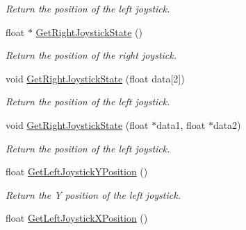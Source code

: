 \begin{DoxyCompactItemize}
\begin{DoxyCompactList}\small\item\em Return the position of the left joystick. \item\end{DoxyCompactList}\item 
\hypertarget{classvtkVSP_a4ec2368aca2a41fa84ac3216c7bc95cd}{
float $\ast$ \hyperlink{classvtkVSP_a4ec2368aca2a41fa84ac3216c7bc95cd}{GetRightJoystickState} ()}
\label{classvtkVSP_a4ec2368aca2a41fa84ac3216c7bc95cd}

\begin{DoxyCompactList}\small\item\em Return the position of the right joystick. \item\end{DoxyCompactList}\item 
\hypertarget{classvtkVSP_ac1791508a42682b6574ffb8d01ac0586}{
void \hyperlink{classvtkVSP_ac1791508a42682b6574ffb8d01ac0586}{GetRightJoystickState} (float data\mbox{[}2\mbox{]})}
\label{classvtkVSP_ac1791508a42682b6574ffb8d01ac0586}

\begin{DoxyCompactList}\small\item\em Return the position of the left joystick. \item\end{DoxyCompactList}\item 
\hypertarget{classvtkVSP_a093602da6356d7a2d83d4b1e0c820969}{
void \hyperlink{classvtkVSP_a093602da6356d7a2d83d4b1e0c820969}{GetRightJoystickState} (float $\ast$data1, float $\ast$data2)}
\label{classvtkVSP_a093602da6356d7a2d83d4b1e0c820969}

\begin{DoxyCompactList}\small\item\em Return the position of the left joystick. \item\end{DoxyCompactList}\item 
\hypertarget{classvtkVSP_ac672ef2c63798003b5b802eb2995c7db}{
float \hyperlink{classvtkVSP_ac672ef2c63798003b5b802eb2995c7db}{GetLeftJoystickYPosition} ()}
\label{classvtkVSP_ac672ef2c63798003b5b802eb2995c7db}

\begin{DoxyCompactList}\small\item\em Return the Y position of the left joystick. \item\end{DoxyCompactList}\item 
\hypertarget{classvtkVSP_abc5c4b774170f69a1e653a830eaa850e}{
float \hyperlink{classvtkVSP_abc5c4b774170f69a1e653a830eaa850e}{GetLeftJoystickXPosition} ()}
\label{classvtkVSP_abc5c4b774170f69a1e653a830eaa850e}


\end{DoxyCompactItemize}
